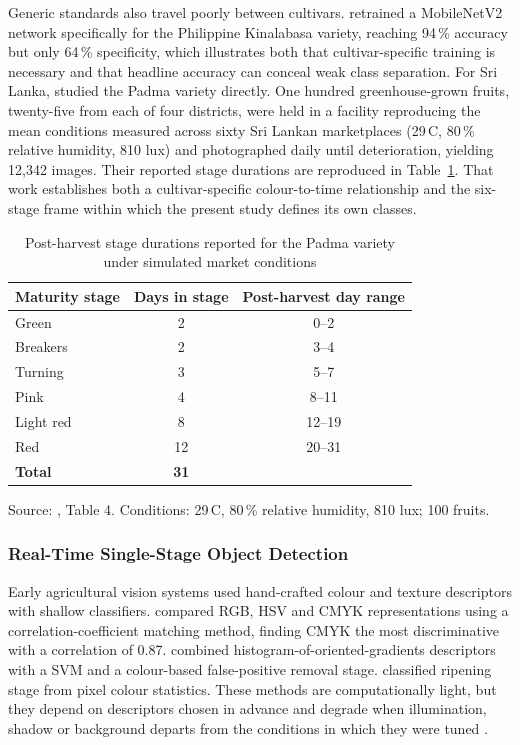 Generic standards also travel poorly between cultivars. \citet{nalupano2024} retrained a MobileNetV2 network specifically for the Philippine Kinalabasa variety, reaching 94\,\% accuracy but only 64\,\% specificity, which illustrates both that cultivar-specific training is necessary and that headline accuracy can conceal weak class separation. For Sri Lanka, \citet{abekoon2024} studied the Padma variety directly. One hundred greenhouse-grown fruits, twenty-five from each of four districts, were held in a facility reproducing the mean conditions measured across sixty Sri Lankan marketplaces (29\,\textdegree C, 80\,\% relative humidity, 810 lux) and photographed daily until deterioration, yielding 12,342 images. Their reported stage durations are reproduced in Table~\ref{tab:abekoon_stages}. That work establishes both a cultivar-specific colour-to-time relationship and the six-stage frame within which the present study defines its own classes.

\begin{table}[H]
\caption{Post-harvest stage durations reported for the Padma variety under simulated market conditions}
\label{tab:abekoon_stages}
\centering
\begin{tabular}{lcc}
\toprule
\textbf{Maturity stage} & \textbf{Days in stage} & \textbf{Post-harvest day range} \\
\midrule
Green       & 2  & 0--2   \\
Breakers    & 2  & 3--4   \\
Turning     & 3  & 5--7   \\
Pink        & 4  & 8--11  \\
Light red   & 8  & 12--19 \\
Red         & 12 & 20--31 \\
\midrule
\textbf{Total} & \textbf{31} & \\
\bottomrule
\end{tabular}

\vspace{2mm}
{\footnotesize Source: \citet{abekoon2024}, Table 4. Conditions: 29\,\textdegree C, 80\,\% relative humidity, 810 lux; 100 fruits.}
\end{table}

\subsubsection{Real-Time Single-Stage Object Detection}
\label{sec:detection}

Early agricultural vision systems used hand-crafted colour and texture descriptors with shallow classifiers. \citet{santoso2024} compared \acrshort{RGB}, \acrshort{HSV} and CMYK representations using a correlation-coefficient matching method, finding CMYK the most discriminative with a correlation of 0.87. \citet{liu2019} combined histogram-of-oriented-gradients descriptors with a \acrfull{SVM} and a colour-based false-positive removal stage. \citet{garcia2019} classified ripening stage from pixel colour statistics. These methods are computationally light, but they depend on descriptors chosen in advance and degrade when illumination, shadow or background departs from the conditions in which they were tuned \citep{ifmalinda2023}.

